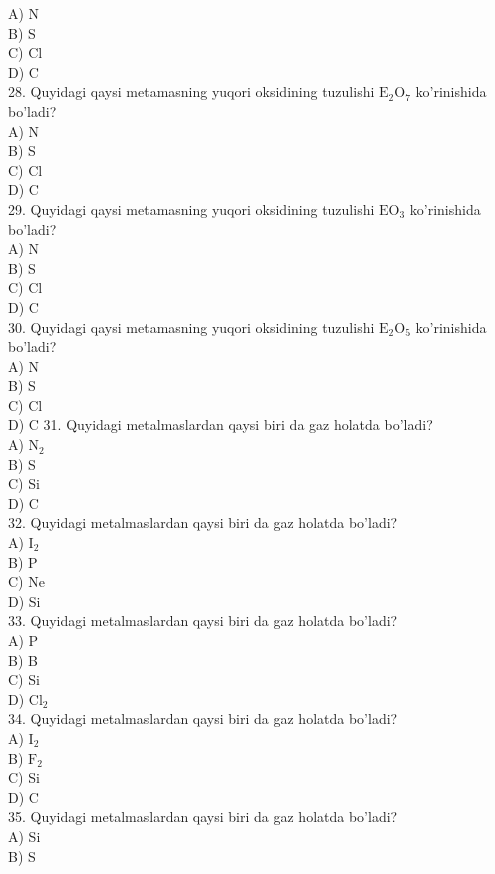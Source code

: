A) N\\
B) S\\
C) Cl\\
D) C\\
28. Quyidagi qaysi metamasning yuqori oksidining tuzulishi $\mathrm{E}_{2} \mathrm{O}_{7}$ ko'rinishida bo'ladi?\\
A) N\\
B) S\\
C) Cl\\
D) C\\
29. Quyidagi qaysi metamasning yuqori oksidining tuzulishi $\mathrm{EO}_{3}$ ko'rinishida bo'ladi?\\
A) N\\
B) S\\
C) Cl\\
D) C\\
30. Quyidagi qaysi metamasning yuqori oksidining tuzulishi $\mathrm{E}_{2} \mathrm{O}_{5}$ ko'rinishida bo'ladi?\\
A) N\\
B) S\\
C) Cl\\
D) C
31. Quyidagi metalmaslardan qaysi biri da gaz holatda bo'ladi?\\
A) $\mathrm{N}_{2}$\\
B) S\\
C) Si\\
D) C\\
32. Quyidagi metalmaslardan qaysi biri da gaz holatda bo'ladi?\\
A) $\mathrm{I}_{2}$\\
B) P\\
C) Ne\\
D) Si\\
33. Quyidagi metalmaslardan qaysi biri da gaz holatda bo'ladi?\\
A) P\\
B) B\\
C) Si\\
D) $\mathrm{Cl}_{2}$\\
34. Quyidagi metalmaslardan qaysi biri da gaz holatda bo'ladi?\\
A) $\mathrm{I}_{2}$\\
B) $\mathrm{F}_{2}$\\
C) Si\\
D) C\\
35. Quyidagi metalmaslardan qaysi biri da gaz holatda bo'ladi?\\
A) Si\\
B) S\\
